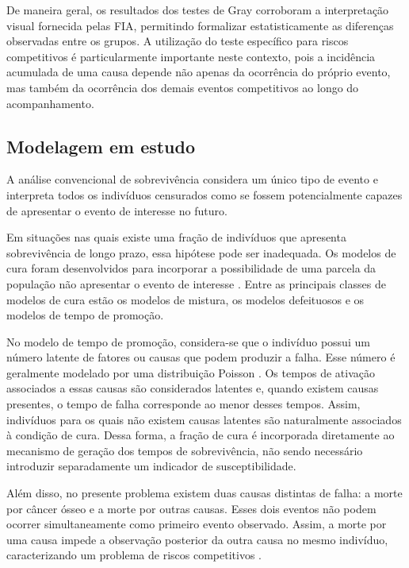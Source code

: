 \documentclass[11pt,a4paper]{article}
\begin{document}
De maneira geral, os resultados dos testes de Gray corroboram a interpretação visual fornecida pelas FIA, permitindo formalizar estatisticamente as diferenças observadas entre os grupos. A utilização do teste específico para riscos competitivos é particularmente importante neste contexto, pois a incidência acumulada de uma causa depende não apenas da ocorrência do próprio evento, mas também da ocorrência dos demais eventos competitivos ao longo do acompanhamento.

\subsection{Modelagem em estudo}

A análise convencional de sobrevivência considera um único tipo de evento e interpreta todos os indivíduos censurados como se fossem potencialmente capazes de apresentar o evento de interesse no futuro.

Em situações nas quais existe uma fração de indivíduos que apresenta sobrevivência de longo prazo, essa hipótese pode ser inadequada. Os modelos de cura foram desenvolvidos para incorporar a possibilidade de uma parcela da população não apresentar o evento de interesse \citep{MallerZhou1996}. Entre as principais classes de modelos de cura estão os modelos de mistura, os modelos defeituosos e os modelos de tempo de promoção.

No modelo de tempo de promoção, considera-se que o indivíduo possui um número latente de fatores ou causas que podem produzir a falha. Esse
número é geralmente modelado por uma distribuição Poisson \citep{Yakovlev1996}. Os tempos de ativação associados a essas causas são considerados latentes e, quando existem causas presentes, o tempo de falha corresponde ao menor desses tempos. Assim, indivíduos para os quais não existem causas latentes são naturalmente associados à condição de cura. Dessa forma, a fração de cura é incorporada diretamente ao mecanismo de geração dos tempos de sobrevivência, não sendo necessário introduzir separadamente um indicador de susceptibilidade.

Além disso, no presente problema existem duas causas distintas de falha: a morte por câncer ósseo e a morte por outras causas. Esses dois eventos não podem ocorrer simultaneamente como primeiro evento observado. Assim, a morte por uma causa
impede a observação posterior da outra causa no mesmo indivíduo, caracterizando um problema de riscos competitivos \citep{pintilie2006competing}.
\end{document}
